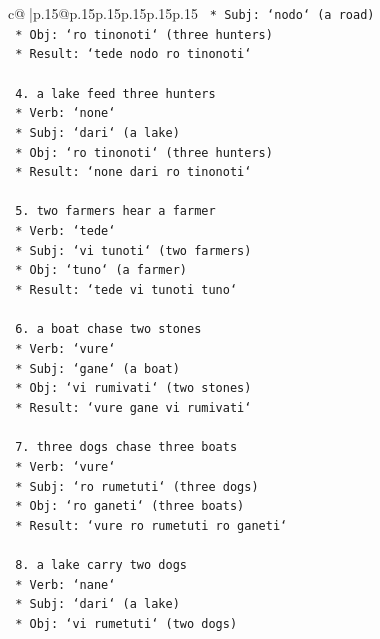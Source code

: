 \documentclass{article}
\begin{document}
{\begin{supertabular}{c@{$\;$}|p{.15\linewidth}@{}p{.15\linewidth}p{.15\linewidth}p{.15\linewidth}p{.15\linewidth}p{.15\linewidth}}
{{{\texttt{        *   Subj: `nodo` (a road)} \\
\texttt{        *   Obj: `ro tinonoti` (three hunters)} \\
\texttt{        *   Result: `tede nodo ro tinonoti`} \\
\\ 
\texttt{    4.  a lake feed three hunters} \\
\texttt{        *   Verb: `none`} \\
\texttt{        *   Subj: `dari` (a lake)} \\
\texttt{        *   Obj: `ro tinonoti` (three hunters)} \\
\texttt{        *   Result: `none dari ro tinonoti`} \\
\\ 
\texttt{    5.  two farmers hear a farmer} \\
\texttt{        *   Verb: `tede`} \\
\texttt{        *   Subj: `vi tunoti` (two farmers)} \\
\texttt{        *   Obj: `tuno` (a farmer)} \\
\texttt{        *   Result: `tede vi tunoti tuno`} \\
\\ 
\texttt{    6.  a boat chase two stones} \\
\texttt{        *   Verb: `vure`} \\
\texttt{        *   Subj: `gane` (a boat)} \\
\texttt{        *   Obj: `vi rumivati` (two stones)} \\
\texttt{        *   Result: `vure gane vi rumivati`} \\
\\ 
\texttt{    7.  three dogs chase three boats} \\
\texttt{        *   Verb: `vure`} \\
\texttt{        *   Subj: `ro rumetuti` (three dogs)} \\
\texttt{        *   Obj: `ro ganeti` (three boats)} \\
\texttt{        *   Result: `vure ro rumetuti ro ganeti`} \\
\\ 
\texttt{    8.  a lake carry two dogs} \\
\texttt{        *   Verb: `nane`} \\
\texttt{        *   Subj: `dari` (a lake)} \\
\texttt{        *   Obj: `vi rumetuti` (two dogs)} \\
}}}
\end{supertabular}}
\end{document}
